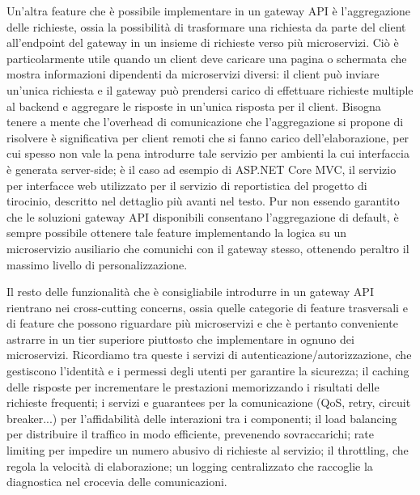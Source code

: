 Un'altra feature che è possibile implementare in un gateway API è l'aggregazione delle richieste, ossia la possibilità di trasformare una richiesta da parte del client all'endpoint del gateway in un insieme di richieste verso più microservizi. Ciò è particolarmente utile quando un client deve caricare una pagina o schermata che mostra informazioni dipendenti da microservizi diversi: il client può inviare un'unica richiesta e il gateway può prendersi carico di effettuare richieste multiple al backend e aggregare le risposte in un'unica risposta per il client.
Bisogna tenere a mente che l'overhead di comunicazione che l'aggregazione si propone di risolvere è significativa per client remoti che si fanno carico dell'elaborazione, per cui spesso non vale la pena introdurre tale servizio per ambienti la cui interfaccia è generata server-side; è il caso ad esempio di ASP.NET Core MVC, il servizio per interfacce web utilizzato per il servizio di reportistica del progetto di tirocinio, descritto nel dettaglio più avanti nel testo.
Pur non essendo garantito che le soluzioni gateway API disponibili consentano l'aggregazione di default, è sempre possibile ottenere tale feature implementando la logica su un microservizio ausiliario che comunichi con il gateway stesso, ottenendo peraltro il massimo livello di personalizzazione.

Il resto delle funzionalità che è consigliabile introdurre in un gateway API rientrano nei cross-cutting concerns, ossia quelle categorie di feature trasversali e di feature che possono riguardare più microservizi e che è pertanto conveniente astrarre in un tier superiore piuttosto che implementare in ognuno dei microservizi. Ricordiamo tra queste i servizi di autenticazione/autorizzazione, che gestiscono l'identità e i permessi degli utenti per garantire la sicurezza; il caching delle risposte per incrementare le prestazioni memorizzando i risultati delle richieste frequenti; i servizi e guarantees per la comunicazione (QoS, retry, circuit breaker...) per l'affidabilità delle interazioni tra i componenti; il load balancing per distribuire il traffico in modo efficiente, prevenendo sovraccarichi; rate limiting per impedire un numero abusivo di richieste al servizio; il throttling, che regola la velocità di elaborazione; un logging centralizzato che raccoglie la diagnostica nel crocevia delle comunicazioni.\cite[44-45]{.NET_Microservices}

